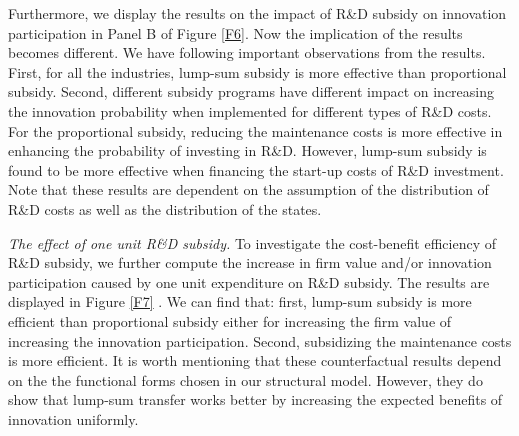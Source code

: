 \documentclass[11pt]{article}
\begin{document}
Furthermore, we display the results on the impact of R\&D subsidy on innovation participation in Panel B of Figure \ref{F6}. Now the implication of the results becomes different. We have following important observations from the results. First, for all the industries, lump-sum subsidy is more effective than proportional subsidy. Second, different subsidy programs have different impact on increasing the innovation probability when implemented for different types of R\&D costs. For the proportional subsidy, reducing the maintenance costs is more effective in enhancing the probability of investing in R\&D. However, lump-sum subsidy is found to be more effective when financing the start-up costs of R\&D investment. Note that these results are dependent on the assumption of the distribution of R\&D costs as well as the distribution of the states. 

\textit{The effect of one unit R\&D subsidy.} To investigate the cost-benefit efficiency of R\&D subsidy, we further compute the increase in firm value and/or innovation participation caused by one unit expenditure on R\&D subsidy. The results are displayed in Figure \ref{F7} . We can find that: first, lump-sum subsidy is more efficient than proportional subsidy either for increasing the firm value of increasing the innovation participation. Second, subsidizing the maintenance costs is more efficient. It is worth mentioning that these counterfactual results depend on the the functional forms chosen in our structural model. However, they do show that lump-sum transfer works better by increasing the expected benefits of innovation uniformly. 
\end{document}
